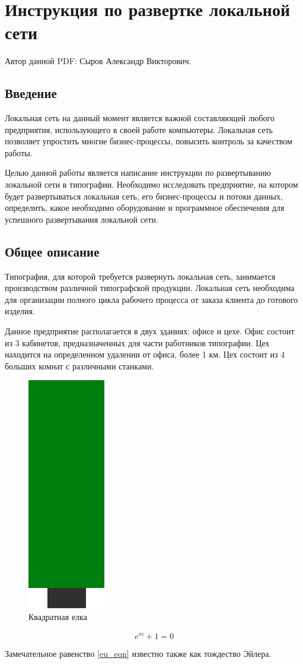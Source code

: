 \documentclass{article}
\author{Сыров Александр Викторович}
\begin{document}
\section{Инструкция по развертке локальной сети}

Автор данной PDF: Сыров Александр Викторович.

\subsection{Введение}

Локальная сеть на данный момент является важной составляющей любого предприятия, использующего в своей работе компьютеры. Локальная сеть позволяет упростить многие бизнес-процессы, повысить контроль за качеством работы.

Целью данной работы является написание инструкции по развертыванию локальной сети в типографии. Необходимо исследовать предприятие, на котором будет развертываться локальная сеть, его бизнес-процессы и потоки данных, определить, какое необходимо оборудование и программное обеспечения для успешного развертывания локальной сети.

\subsection{Общее описание}

Типография, для которой требуется развернуть локальная сеть, занимается производством различной типографской продукции. Локальная сеть необходима для организации полного цикла рабочего процесса от заказа клиента до готового изделия.

Данное предприятие располагается в двух зданиях: офисе и цехе. Офис состоит из 3 кабинетов, предназначенных для части работников типографии. Цех находится на определенном удалении от офиса, более 1 км. Цех состоит из 4 больших комнат с различными станками.

\newpage

\begin{figure}[h!]
	\includegraphics[scale=0.3]{../img/tree.png}
	\caption{Квадратная елка}
\end{figure}

\begin{equation} \label{eu_eqn}
    e^{\pi i} + 1 = 0
\end{equation}

Замечательное равенство \ref{eu_eqn} известно также как тождество Эйлера.

\newpage

\tableofcontents
\end{document}
